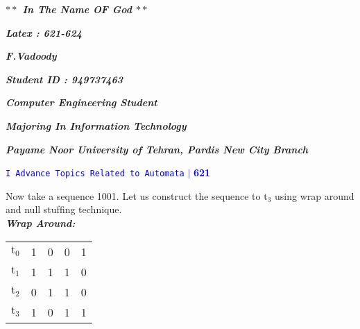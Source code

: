 \documentclass[a4]{article}
\begin{document}
	
	
	
	\newpage
	
	\vspace*{1cm}
	\begin{center}
		
		{\Huge{\textbf{\textit{$**$ In The Name OF God  $**$}}}}\vspace*{3cm}
		
		
		{\huge{\textbf{\textit{Latex : 621-624}}}}\vspace*{1cm}
		
		
		{\huge{\textbf{\textit{F.Vadoody}}}}\vspace*{1cm}
		
		
		{\huge{\textbf{\textit{Student ID : 949737463}}}}	\vspace*{1cm}
		
		{\huge{\textbf{\textit{Computer Engineering Student}}}}	\vspace*{0.9cm}
		
		{\huge{\textbf{\textit{Majoring In Information Technology}}}}	\vspace*{1cm}
		
		{\huge{\textbf{\textit{Payame Noor University of Tehran, Pardis New City Branch}}}}	\vspace*{1cm}
		
		
	\end{center}
	\vspace*{0.2cm}
	
	\newpage
	\begin{flushright}
		\textcolor{blue}{\hspace*{0.5cm} \texttt{I Advance Topics Related to Automata} \hspace*{0.1cm}\textbf{$|$} \textbf{621}}
	\end{flushright}
	
	\vspace*{0.5cm}
	
	
	Now take a sequence 1001. Let us construct the sequence to $\mathrm{t}_{3}$ using wrap around and null stufﬁng technique.
	\vspace*{0.2cm}\\
	\large{\textbf{\textit{Wrap Around:}}}
	
	\begin{center}
		\begin{tabular}{lllll}
			\hline
			$\mathrm{t}_{0}$\hspace*{0.7cm}& 1\hspace*{0.7cm} & 0\hspace*{0.7cm} & 0\hspace*{0.7cm} & 1 \\
			$\mathrm{t}_{1}$ & 1 & 1 & 1 & 0 \\
			$\mathrm{t}_{2}$ & 0 & 1 & 1 & 0 \\
			$\mathrm{t}_{3}$ & 1 & 0 & 1 & 1 \\
			\hline
		\end{tabular}
	\end{center}
	
\end{document}
